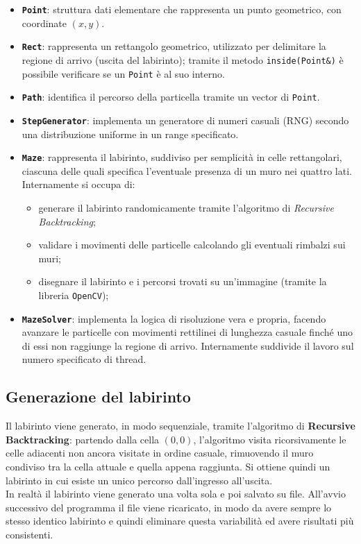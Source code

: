 \documentclass{article}
\newcommand{\code}[1]{\texttt{#1}}
\begin{document}
\begin{itemize}
    \item \textbf{\code{Point}}: struttura dati elementare che rappresenta un punto geometrico, con coordinate $(x, y)$.
    \item \textbf{\code{Rect}}: rappresenta un rettangolo geometrico, utilizzato per delimitare la regione di arrivo (uscita del labirinto); tramite il metodo \code{inside(Point\&)} è possibile verificare se un \code{Point} è al suo interno.
    \item \textbf{\code{Path}}: identifica il percorso della particella tramite un vector di \code{Point}.
    \item \textbf{\code{StepGenerator}}: implementa un generatore di numeri casuali (RNG) secondo una distribuzione uniforme in un range specificato.
    \item \textbf{\code{Maze}}: rappresenta il labirinto, suddiviso per semplicità in celle rettangolari, ciascuna delle quali specifica l'eventuale presenza di un muro nei quattro lati. Internamente si occupa di:
    \begin{itemize}
        \item generare il labirinto randomicamente tramite l'algoritmo di \textit{Recursive Backtracking};
        \item validare i movimenti delle particelle calcolando gli eventuali rimbalzi sui muri;
        \item disegnare il labirinto e i percorsi trovati su un'immagine (tramite la libreria \code{OpenCV});
    \end{itemize}
    \item \textbf{\code{MazeSolver}}: implementa la logica di risoluzione vera e propria, facendo avanzare le particelle con movimenti rettilinei di lunghezza casuale finché uno di essi non raggiunge la regione di arrivo. Internamente suddivide il lavoro sul numero specificato di thread.
\end{itemize}

\newpage

\subsection{Generazione del labirinto}
Il labirinto viene generato, in modo sequenziale, tramite l'algoritmo di \textbf{Recursive Backtracking}: partendo dalla cella $(0,0)$, l'algoritmo visita ricorsivamente le celle adiacenti non ancora visitate in ordine casuale, rimuovendo il muro condiviso tra la cella attuale e quella appena raggiunta. Si ottiene quindi un labirinto in cui esiste un unico percorso dall'ingresso all'uscita.\\
In realtà il labirinto viene generato una volta sola e poi salvato su file. All'avvio successivo del programma il file viene ricaricato, in modo da avere sempre lo stesso identico labirinto e quindi eliminare questa variabilità ed avere risultati più consistenti.
\end{document}
